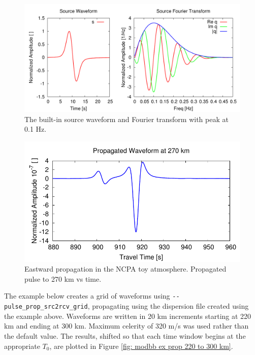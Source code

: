 \begin{figure}
\begin{center}
\includegraphics[scale=0.65]{figs/modbb_ex_source_model}
\end{center}
\caption{The built-in source waveform and Fourier transform with peak at 0.1 Hz.}
\label{fig: modbb ex built-in pulse}
\end{figure}

\begin{figure}
\begin{center}
\includegraphics[scale=0.65]{figs/modbb_ex_prop_pulse}
\end{center}
\caption{Eastward propagation in the NCPA toy atmosphere. Propagated pulse to 270 km vs time.}
\label{fig: modbb ex prop to 270 km}
\end{figure}

The example below creates a grid of waveforms using \verb+--pulse_prop_src2rcv_grid+, propagating using the dispersion file created using the example above. Waveforms are written in 20 km increments starting at 220 km and ending at 300 km. Maximum celerity of 320 m/s was used rather than the default value. The results, shifted so that each time window begins at the appropriate $T_0$, are plotted in Figure \ref{fig: modbb ex prop 220 to 300 km}.

